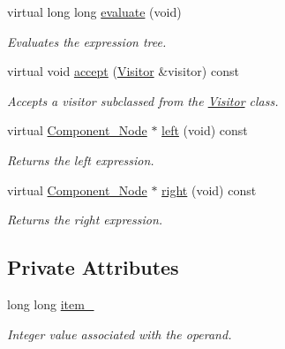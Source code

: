 \begin{DoxyCompactItemize}
virtual long long \hyperlink{classMadara_1_1Expression__Tree_1_1Leaf__Node_a4bd377264487997762d3c4e8a88a32a4}{evaluate} (void)
\begin{DoxyCompactList}\small\item\em Evaluates the expression tree. \item\end{DoxyCompactList}\item 
virtual void \hyperlink{classMadara_1_1Expression__Tree_1_1Leaf__Node_aa56517272d5f33ffe766cd88bc0e502d}{accept} (\hyperlink{classMadara_1_1Expression__Tree_1_1Visitor}{Visitor} \&visitor) const 
\begin{DoxyCompactList}\small\item\em Accepts a visitor subclassed from the \hyperlink{classMadara_1_1Expression__Tree_1_1Visitor}{Visitor} class. \item\end{DoxyCompactList}\item 
virtual \hyperlink{classMadara_1_1Expression__Tree_1_1Component__Node}{Component\_\-Node} $\ast$ \hyperlink{classMadara_1_1Expression__Tree_1_1Component__Node_abe0c7474f1af4cb06d06ab13479a89db}{left} (void) const 
\begin{DoxyCompactList}\small\item\em Returns the left expression. \item\end{DoxyCompactList}\item 
virtual \hyperlink{classMadara_1_1Expression__Tree_1_1Component__Node}{Component\_\-Node} $\ast$ \hyperlink{classMadara_1_1Expression__Tree_1_1Component__Node_a672f2b18b4e63efda38e9063a47bc30f}{right} (void) const 
\begin{DoxyCompactList}\small\item\em Returns the right expression. \item\end{DoxyCompactList}\end{DoxyCompactItemize}
\subsection*{Private Attributes}
\begin{DoxyCompactItemize}
\item 
long long \hyperlink{classMadara_1_1Expression__Tree_1_1Leaf__Node_a5623e989280b33eca0c9ca29d490aae3}{item\_\-}
\begin{DoxyCompactList}\small\item\em Integer value associated with the operand. \item\end{DoxyCompactList}\end{DoxyCompactItemize}


